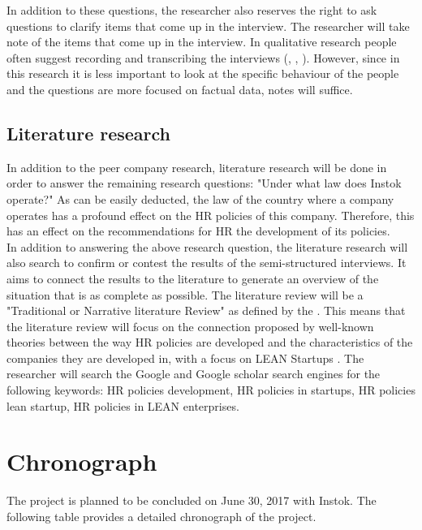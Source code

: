 \documentclass[man]{apa6}
\begin{document}
In addition to these questions, the researcher also reserves the right to ask questions to clarify items that come up in the interview. The researcher will take note of the items that come up in the interview. In qualitative research people often suggest recording and transcribing the interviews (\parencite{HUMBLE}, \parencite{BAILEY2008}, \parencite{THOMSON2014}). However, since in this research it is less important to look at the specific behaviour of the people and the questions are more focused on factual data, notes will suffice.

\subsection{Literature research}
In addition to the peer company research, literature research will be done in order to answer the remaining research questions: "Under what law does Instok operate?" As can be easily deducted, the law of the country where a company operates has a profound effect on the HR policies of this company. Therefore, this has an effect on the recommendations for HR the development of its policies.\\
In addition to answering the above research question, the literature research will also search to confirm or contest the results of the semi-structured interviews. It aims to connect the results to the literature to generate an overview of the situation that is as complete as possible.	The literature review will be a "Traditional or Narrative literature Review" as defined by the \cite{TOLEDO2016}. This means that the literature review will focus on the connection proposed by well-known theories between the way HR policies are developed and the characteristics of the companies they are developed in, with a focus on LEAN Startups \parencite{RIES2011}. The researcher will search the Google and Google scholar search engines for the following keywords: HR policies development, HR policies in startups, HR policies lean startup, HR policies in LEAN enterprises.

\section{Chronograph}
The project is planned to be concluded on June 30, 2017 with Instok. The following table provides a detailed chronograph of the project.
\end{document}
